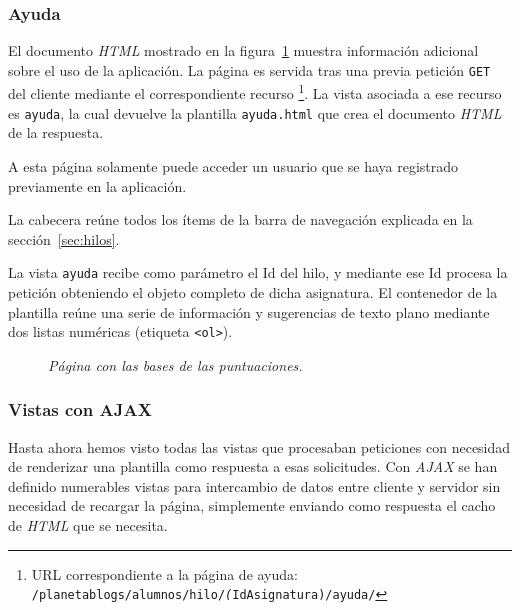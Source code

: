 \documentclass[a4paper, 12pt]{book}
\begin{document}
\subsubsection{Ayuda} 
\label{sec:ayuda}
El documento \textit{HTML} mostrado en la figura~\ref{fig:ayuda} muestra informaci\'on adicional sobre el uso de la aplicaci\'on. 
La p\'agina es servida tras una previa petici\'on \texttt{GET} del cliente mediante el correspondiente recurso \footnote{URL correspondiente a la p\'agina de 
ayuda:\\ \texttt{/planetablogs/alumnos/hilo/\textit(IdAsignatura)/ayuda/}}. La vista asociada a ese recurso es 
\texttt{ayuda}, la cual devuelve la plantilla \texttt{ayuda.html} que crea el documento \textit{HTML} de la respuesta.

A esta p\'agina solamente puede acceder un usuario que se haya registrado previamente en la aplicaci\'on.

La cabecera re\'une todos los \'items de la barra de navegaci\'on explicada en la secci\'on~\ref{sec:hilos}.

La vista \texttt{ayuda} recibe como par\'ametro el Id del hilo, y mediante ese Id procesa la petici\'on obteniendo el objeto completo de dicha 
asignatura. El contenedor de la plantilla re\'une una serie de informaci\'on y sugerencias de texto plano mediante dos listas num\'ericas 
(etiqueta \texttt{<ol>}).

\begin{figure}
  \centering
  \caption{\textit{P\'agina con las bases de las puntuaciones.}}
  \label{fig:ayuda}
\end{figure}

\subsubsection{Vistas con AJAX} 
\label{sec:vistasajax}
Hasta ahora hemos visto todas las vistas que procesaban peticiones con necesidad de renderizar una plantilla como respuesta a esas solicitudes. Con 
\textit{AJAX} se han definido numerables vistas para intercambio de datos entre cliente y servidor sin necesidad de recargar la p\'agina, simplemente 
enviando como respuesta el cacho de \textit{HTML} que se necesita.
\end{document}
